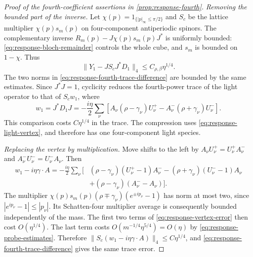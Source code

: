 \begin{proof}[Proof of the fourth-coefficient assertions in \cref{prop:response-fourth}]
\emph{Removing the bounded part of the inverse.}
Let $\chi(p)=1_{\{|p|_\infty\le\pi/2\}}$ and
$S_c$ be the lattice multiplier $\chi(p)s_m(p)$ on
four-component antiperiodic spinors. The complementary
inverse
$R_m(p)-J\chi(p)s_m(p)J^*$ is uniformly bounded:
\eqref{eq:response-bloch-remainder} controls the whole
cube, and $s_m$ is bounded on $1-\chi$. Thus
\[
 \|Y_1-JS_cJ^*D_1\|_4\le C_{\rho,\beta}\eta^{1/4}.
\]
The two norms in \eqref{eq:response-fourth-trace-difference}
are bounded by the same estimates. Since $J^*J=1$,
cyclicity reduces the fourth-power trace of the light
operator to that of $S_cw_1$, where
\begin{equation}\label{eq:response-compressed-vertex}
 w_1=J^*D_1J=-\frac{i\eta}{2}\sum_\nu
       [A_\nu(\rho-\gamma_\nu)U_\nu^+
             -A_\nu^-(\rho+\gamma_\nu)U_\nu^-].
\end{equation}
This comparison costs $C\eta^{1/4}$ in the trace. The
compression uses \eqref{eq:response-light-vertex}, and
therefore has one four-component light species.

\emph{Replacing the vertex by multiplication.}
Move shifts to the left by
$A_\nu U_\nu^+=U_\nu^+A_\nu^-$ and
$A_\nu^-U_\nu^-=U_\nu^-A_\nu$. Then
\begin{equation}\label{eq:response-vertex-error}
 \begin{split}
 w_1-i\eta\gamma\cdot A=-\frac{i\eta}{2}\sum_\nu\big[&
  (\rho-\gamma_\nu)(U_\nu^+-1)A_\nu^-
       -(\rho+\gamma_\nu)(U_\nu^--1)A_\nu\\
       &+(\rho-\gamma_\nu)(A_\nu^--A_\nu)\big].
 \end{split}
\end{equation}
The multiplier
$\chi(p)s_m(p)(\rho\mp\gamma_\nu)(e^{\pm ip_\nu}-1)$
has norm at most two, since $|e^{ip_\nu}-1|\le|p_\nu|$.
Its Schatten-four multiplier average is consequently
bounded independently of the mass. The first two terms
of \eqref{eq:response-vertex-error} then cost
$O(\eta^{1/4})$. The last term costs
$O(m^{-1/4}\eta^{5/4})=O(\eta)$ by
\eqref{eq:response-probe-estimates}. Therefore
$\|S_c(w_1-i\eta\gamma\cdot A)\|_4\le C\eta^{1/4}$,
and \eqref{eq:response-fourth-trace-difference} gives
the same trace error.


\end{proof}
